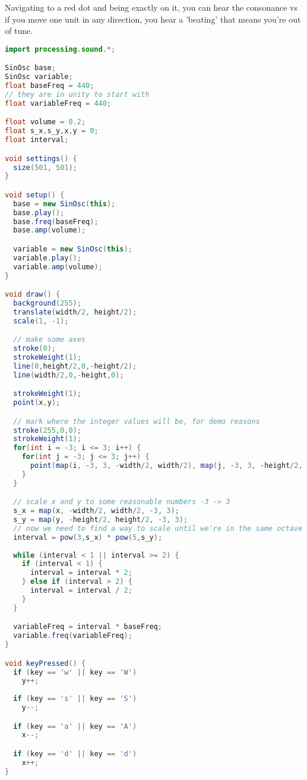 \documentclass[10pt,a4paper]{article}
\begin{document}
Navigating to a red dot and being exactly on it, you can hear the consonance vs if you move one unit
in any direction, you hear a 'beating' that means you're out of tune.
\begin{lstlisting}[language=java]
import processing.sound.*;

SinOsc base;
SinOsc variable;
float baseFreq = 440;
// they are in unity to start with
float variableFreq = 440;

float volume = 0.2;
float s_x,s_y,x,y = 0;
float interval;

void settings() {
  size(501, 501);
}

void setup() {  
  base = new SinOsc(this);
  base.play();
  base.freq(baseFreq);
  base.amp(volume);

  variable = new SinOsc(this);
  variable.play();
  variable.amp(volume);
}

void draw() {
  background(255);
  translate(width/2, height/2);
  scale(1, -1);

  // make some axes
  stroke(0);
  strokeWeight(1);
  line(0,height/2,0,-height/2);
  line(width/2,0,-height,0);

  strokeWeight(1);
  point(x,y);

  // mark where the integer values will be, for demo reasons
  stroke(255,0,0);
  strokeWeight(1);
  for(int i = -3; i <= 3; i++) {
    for(int j = -3; j <= 3; j++) {
      point(map(i, -3, 3, -width/2, width/2), map(j, -3, 3, -height/2, height/2));
    }
  }

  // scale x and y to some reasonable numbers -3 -> 3 
  s_x = map(x, -width/2, width/2, -3, 3);
  s_y = map(y, -height/2, height/2, -3, 3);
  // now we need to find a way to scale until we're in the same octave
  interval = pow(3,s_x) * pow(5,s_y);
  
  while (interval < 1 || interval >= 2) {
    if (interval < 1) {
      interval = interval * 2;
    } else if (interval > 2) {
      interval = interval / 2;
    }
  }

  variableFreq = interval * baseFreq;
  variable.freq(variableFreq);
}

void keyPressed() {
  if (key == 'w' || key == 'W')
    y++;
  
  if (key == 's' || key == 'S')
    y--;

  if (key == 'a' || key == 'A')
    x--;

  if (key == 'd' || key == 'd')
    x++;
}
\end{lstlisting}
\end{document}
